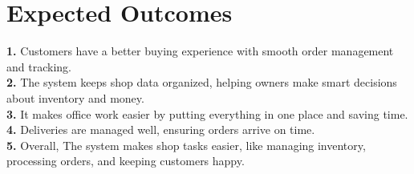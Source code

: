 \section{Expected Outcomes}
   \textbf{1. }Customers have a better buying experience with smooth order management and tracking.\\
   \textbf{2. }The system keeps shop data organized, helping owners make smart decisions about inventory and money.\\
   \textbf{3. }It makes office work easier by putting everything in one place and saving time.\\
   \textbf{4. }Deliveries are managed well, ensuring orders arrive on time.\\
   \textbf{5. }Overall, The system makes shop tasks easier, like managing inventory, processing orders, and keeping customers happy.
   



